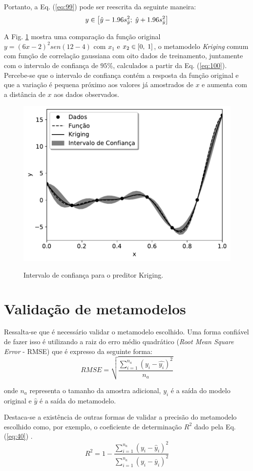 Portanto, a Eq. (\ref{eq:99}) pode ser reescrita da seguinte maneira:
\begin{equation}
y \in  \left[{\hat y}-1.96{s}^2_{\hat y};\hspace{0.1 cm} {\hat y}+1.96{s}^2_{\hat y}\right] 
\label{eq:100}
\end{equation}

A Fig. \ref{fig:ic} mostra uma comparação da função original $y = \left(6x-2\right)^2sen\left(12-4\right)$ com ${x}_1$ e ${x}_2  \in [0,\hspace{0.1 cm}1] $, o metamodelo {\it Kriging} comum com função de correlação gaussiana com oito dados de treinamento, juntamente com o intervalo de confiança de $95 \%$, calculados a partir da Eq. (\ref{eq:100}). Percebe-se que o intervalo de confiança contém a resposta da função original e que a variação é pequena próximo aos valores já amostrados de $ x $ e aumenta com a distância de $ x $ aos dados observados.

\begin{figure}[t]
	\centering
	{\includegraphics[width=0.7\linewidth]{tatiane/fig_tati/ic/ic1.pdf}} 
	\caption{Intervalo de confiança para o preditor Kriging.} 
	\label{fig:ic}
\end{figure}

\section{Validação de metamodelos}

Ressalta-se que é necessário validar o metamodelo escolhido. Uma forma confiável de fazer isso é utilizando a raiz do erro médio quadrático (\textit{Root Mean Square Error} - RMSE) que é expresso da seguinte forma:
\begin{equation}
RMSE = \sqrt{\frac{\sum_{i=1}^{n_a} ({y_i} - \hat{y_i})^2} {n_a}}
 \label{eq:36}
\end{equation}

\noindent onde $n_a$ representa o tamanho da amostra adicional, $y_i$ é a saída do modelo original e $\hat{y}$ é a saída do metamodelo. 

Destaca-se a existência de outras formas de validar a precisão do metamodelo escolhido como, por exemplo, o coeficiente de determinação $R^2$ dado pela Eq. (\ref{eq:40}) \cite{Erickson2018}.
\begin{equation}
R^{2}= 1-{\frac{\sum_{i=1}^{n_a}({y_i}-\hat{y}_i)^2} {\sum_{i=1}^{n_a}({y_i}-\bar{y}_i)^2}}
\label{eq:40}
\end{equation}